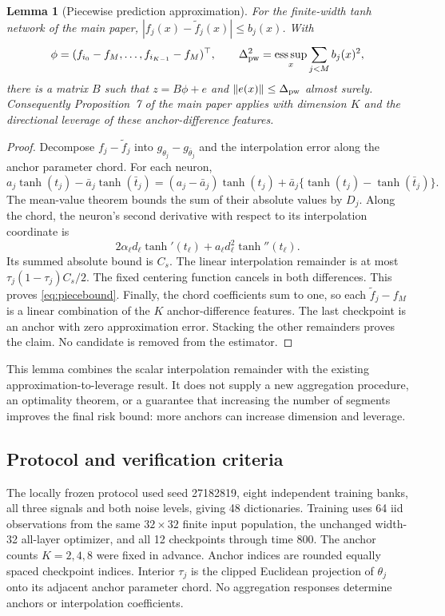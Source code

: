 \documentclass[pdflatex,sn-mathphys-ay]{sn-jnl}
\newtheorem{pathlemma}{Lemma}\renewcommand{\thepathlemma}{S\arabic{pathlemma}}
\theoremstyle{remark}\newtheorem{remark}[theorem]{Remark}
\begin{document}
\begin{pathlemma}[Piecewise prediction approximation]
For the finite-width tanh network of the main paper, $|f_j(x)-\widetilde f_j(x)|\leq b_j(x)$. With
\[
 \phi=(f_{i_0}-f_M,\ldots,f_{i_{K-1}}-f_M)^\top,
 \qquad \Delta_{\rm pw}^2=\mathop{\mathrm{ess\,sup}}_x\sum_{j<M}b_j(x)^2,
\]
there is a matrix $B$ such that $z=B\phi+e$ and $\|e(x)\|\leq\Delta_{\rm pw}$ almost surely. Consequently Proposition~7 of the main paper applies with dimension $K$ and the directional leverage of these anchor-difference features.
\end{pathlemma}
\begin{proof}
Decompose $f_j-\widetilde f_j$ into $g_{\theta_j}-g_{\bar\theta_j}$ and the interpolation error along the anchor parameter chord. For each neuron,
\[
 a_j\tanh(t_j)-\bar a_j\tanh(\bar t_j)
 =(a_j-\bar a_j)\tanh(t_j)+\bar a_j\{\tanh(t_j)-\tanh(\bar t_j)\}.
\]
The mean-value theorem bounds the sum of their absolute values by $D_j$. Along the chord, the neuron's second derivative with respect to its interpolation coordinate is
\[
 2\alpha_\ell d_\ell\tanh'(t_\ell)
 +a_\ell d_\ell^2\tanh''(t_\ell).
\]
Its summed absolute bound is $C_s$. The linear interpolation remainder is at most $\tau_j(1-\tau_j)C_s/2$. The fixed centering function cancels in both differences. This proves \eqref{eq:piecebound}. Finally, the chord coefficients sum to one, so each $\widetilde f_j-f_M$ is a linear combination of the $K$ anchor-difference features. The last checkpoint is an anchor with zero approximation error. Stacking the other remainders proves the claim. No candidate is removed from the estimator.
\end{proof}
This lemma combines the scalar interpolation remainder with the existing approximation-to-leverage result. It does not supply a new aggregation procedure, an optimality theorem, or a guarantee that increasing the number of segments improves the final risk bound: more anchors can increase dimension and leverage.

\subsection{Protocol and verification criteria}
The locally frozen protocol used seed 27182819, eight independent training banks, all three signals and both noise levels, giving 48 dictionaries. Training uses 64 iid observations from the same $32\times32$ finite input population, the unchanged width-32 all-layer optimizer, and all 12 checkpoints through time 800. The anchor counts $K=2,4,8$ were fixed in advance. Anchor indices are rounded equally spaced checkpoint indices. Interior $\tau_j$ is the clipped Euclidean projection of $\theta_j$ onto its adjacent anchor parameter chord. No aggregation responses determine anchors or interpolation coefficients.
\end{document}
